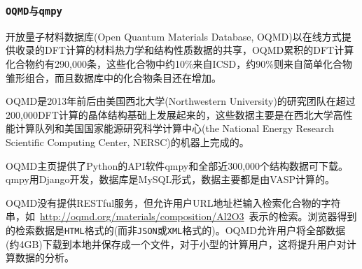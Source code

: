 \frame
{
\frametitle{\tt{OQMD}与\tt{qmpy}}
开放量子材料数据库\textrm{(Open Quantum Materials Database, OQMD)}以在线方式提供收录的\textrm{DFT}计算的材料热力学和结构性质数据的共享\cite{OQMD_URL,NCM1-15010_2015}，\textrm{OQMD}累积的\textrm{DFT}计算化合物约有290,000条，这些化合物中约10\%来自\textrm{ICSD}，约90\%则来自简单化合物雏形组合，而且数据库中的化合物条目还在增加。

\textrm{OQMD}是2013年前后由美国西北大学\textrm{(Northwestern University)}的研究团队在超过200,000\textrm{DFT}计算的晶体结构基础上发展起来的，这些数据主要是在西北大学高性能计算队列和美国国家能源研究科学计算中心\textrm{(the National Energy Research Scientific Computing Center, NERSC)}的机器上完成的。

\textrm{OQMD}主页提供了\textrm{Python}的\textrm{API}软件\textrm{qmpy}\cite{qmpy_URL}和全部近300,000个结构数据可下载。\textrm{qmpy}用\textrm{Django}开发，数据库是\textrm{MySQL}形式，数据主要都是由\textrm{VASP}计算的。

\textrm{OQMD}没有提供\textrm{RESTful}服务，但允许用户\textrm{URL}地址栏输入检索化合物的字符串，如~\textrm{\url{http://oqmd.org/materials/composition/Al2O3}}~表示的检索。浏览器得到的检索数据是\texttt{HTML}格式的(而非\texttt{JSON}或\texttt{XML}格式的)。\textrm{OQMD}允许用户将全部数据(约4\textrm{GB})下载到本地并保存成一个文件，对于小型的计算用户，这将提升用户对计算数据的分析。
}


